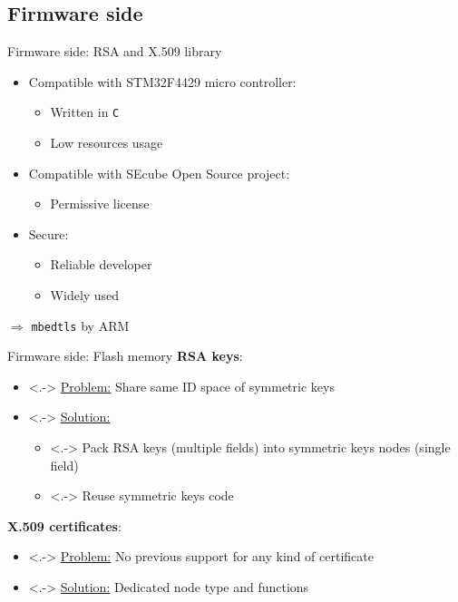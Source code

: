 \documentclass[aspectratio=169]{beamer}
\begin{document}
\subsection{Firmware side}
\begin{frame}{Firmware side: RSA and X.509 library}
	\begin{itemize}
		\item Compatible with STM32F4429 micro controller:
			\begin{itemize}
				\item Written in \texttt{C}
				\item Low resources usage
			\end{itemize}
		\item Compatible with SEcube Open Source project:
			\begin{itemize}
				\item Permissive license
			\end{itemize}
		\item Secure:
			\begin{itemize}
				\item Reliable developer
				\item Widely used
			\end{itemize}
	\end{itemize}

	\pause{}
	\begin{center}
		$\Rightarrow$ \texttt{mbedtls} by ARM
	\end{center}
\end{frame}
\begin{frame}{Firmware side: Flash memory}
	\textbf{RSA keys}:
	\begin{itemize}
		\item<.-> \ul{Problem:} Share same ID space of symmetric keys
		\item<.-> \ul{Solution:}
			\begin{itemize}
				\item<.-> Pack RSA keys (multiple fields) into
					symmetric keys nodes (single field)
				\item<.-> Reuse symmetric keys code
			\end{itemize}
	\end{itemize}

	\pause
	\textbf{X.509 certificates}:
	\begin{itemize}
		\item<.-> \ul{Problem:}
			No previous support for any kind of certificate
		\item<.-> \ul{Solution:}
			Dedicated node type and functions
	\end{itemize}
\end{frame}
\end{document}
